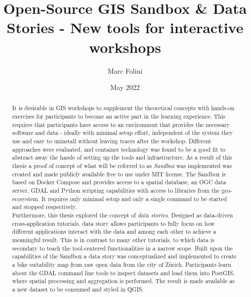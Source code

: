 \documentclass[11pt, a4paper, oneside, parskip=full-]{scrartcl}
\title{Open-Source GIS Sandbox \& Data Stories - New tools for interactive workshops}
\author{Marc Folini}
\date{May 2022}
\begin{document}
\begin{titlepage}
  \setcounter{page}{1}
  \clearpage\maketitle
  \thispagestyle{empty}
  \begin{abstract}
    It is desirable in GIS workshops to supplement the theoretical concepts with
    hands-on exercises for participants to become an active part in the learning
    experience. This requires that participants have access to an environment
    that provides the necessary software and data - ideally with minimal setup
    effort, independent of the system they use and easy to uninstall without
    leaving traces after the workshop. Different approaches were evaluated, and
    container technology was found to be a good fit to abstract away the hassle
    of setting up the tools and infrastructure. As a result of this thesis a
    proof of concept of what will be referred to as \emph{Sandbox} was
    implemented was created and made publicly available free to use under MIT
    license. The Sandbox is based on Docker Compose and provides access to a
    spatial database, an OGC data server, GDAL and Python scripting capabilities
    with access to libraries from the geo-ecosystem. It requires only minimal
    setup and only a single command to be started and stopped respectively.\\

    Furthermore, this thesis explored the concept of \emph{data stories}.
    Designed as data-driven cross-application tutorials, data story allows
    participants to fully focus on how different applications interact with the
    data and among each other to achieve a meaningful result. This is in
    contrast to many other tutorials, to which data is secondary to teach the
    tool-centered functionalities in a narrow scope. Built upon the capabilities
    of the Sandbox a data story was conceptualized and implemented to create a
    bike suitability map from raw open data from the city of Zürich.
    Participants learn about the GDAL command line tools to inspect datasets and
    load them into PostGIS, where spatial processing and aggregation is
    performed. The result is made available as a new dataset to be consumed and
    styled in QGIS.
  \end{abstract}
\end{titlepage}
\end{document}
